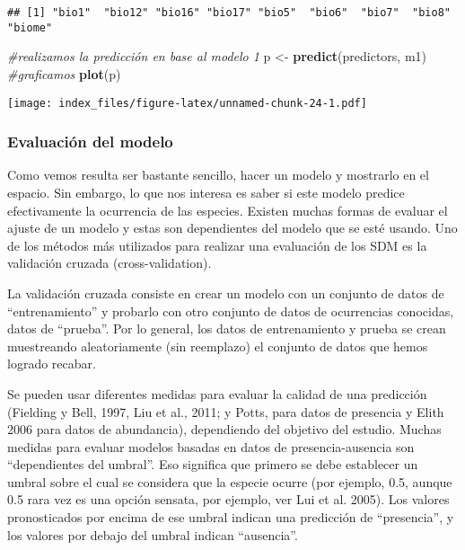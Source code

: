 \documentclass[]{article}
\newenvironment{Shaded}{\begin{snugshade}}{\end{snugshade}}
\newcommand{\KeywordTok}[1]{\textcolor[rgb]{0.13,0.29,0.53}{\textbf{{#1}}}}
\newcommand{\StringTok}[1]{\textcolor[rgb]{0.31,0.60,0.02}{{#1}}}
\newcommand{\CommentTok}[1]{\textcolor[rgb]{0.56,0.35,0.01}{\textit{{#1}}}}
\newcommand{\NormalTok}[1]{{#1}}
\begin{document}
\begin{verbatim}
## [1] "bio1"  "bio12" "bio16" "bio17" "bio5"  "bio6"  "bio7"  "bio8"  "biome"
\end{verbatim}

\begin{Shaded}
\begin{Highlighting}[]
\CommentTok{#realizamos la predicción en base al modelo 1}
\NormalTok{p <-}\StringTok{ }\KeywordTok{predict}\NormalTok{(predictors, m1)}
\CommentTok{#graficamos}
\KeywordTok{plot}\NormalTok{(p)}
\end{Highlighting}
\end{Shaded}

\texttt{[image: index\_files/figure-latex/unnamed-chunk-24-1.pdf]}

\subsubsection{Evaluación del modelo}\label{evaluacion-del-modelo}

Como vemos resulta ser bastante sencillo, hacer un modelo y mostrarlo en
el espacio. Sin embargo, lo que nos interesa es saber si este modelo
predice efectivamente la ocurrencia de las especies. Existen muchas
formas de evaluar el ajuste de un modelo y estas son dependientes del
modelo que se esté usando. Uno de los métodos más utilizados para
realizar una evaluación de los SDM es la validación cruzada
(cross-validation).

La validación cruzada consiste en crear un modelo con un conjunto de
datos de ``entrenamiento'' y probarlo con otro conjunto de datos de
ocurrencias conocidas, datos de ``prueba''. Por lo general, los datos de
entrenamiento y prueba se crean muestreando aleatoriamente (sin
reemplazo) el conjunto de datos que hemos logrado recabar.

Se pueden usar diferentes medidas para evaluar la calidad de una
predicción (Fielding y Bell, 1997, Liu et al., 2011; y Potts, para datos
de presencia y Elith 2006 para datos de abundancia), dependiendo del
objetivo del estudio. Muchas medidas para evaluar modelos basadas en
datos de presencia-ausencia son ``dependientes del umbral''. Eso
significa que primero se debe establecer un umbral sobre el cual se
considera que la especie ocurre (por ejemplo, 0.5, aunque 0.5 rara vez
es una opción sensata, por ejemplo, ver Lui et al. 2005). Los valores
pronosticados por encima de ese umbral indican una predicción de
``presencia'', y los valores por debajo del umbral indican ``ausencia''.
\end{document}
